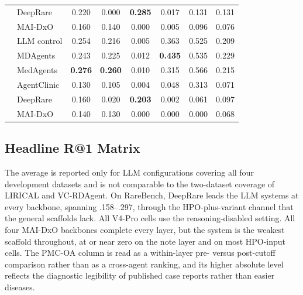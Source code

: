 \begin{table}[hbpt]
\begin{tabular}{@{}llcccccc@{}}
 & DeepRare & 0.220 & 0.000 & \textbf{0.285} & 0.017 & 0.131 & 0.131 \\
 & MAI-DxO & 0.160 & 0.140 & 0.000 & 0.005 & 0.096 & 0.076 \\
\midrule
{} & LLM control & 0.254 & 0.216 & 0.005 & 0.363 & 0.525 & 0.209 \\
 & MDAgents & 0.243 & 0.225 & 0.012 & \textbf{0.435} & 0.535 & 0.229 \\
 & MedAgents & \textbf{0.276} & \textbf{0.260} & 0.010 & 0.315 & 0.566 & 0.215 \\
 & AgentClinic & 0.130 & 0.105 & 0.004 & 0.048 & 0.313 & 0.071 \\
 & DeepRare & 0.160 & 0.020 & \textbf{0.203} & 0.002 & 0.061 & 0.097 \\
 & MAI-DxO & 0.140 & 0.130 & 0.000 & 0.000 & 0.000 & 0.068 \\
\bottomrule
\end{tabular}
\end{table}
\subsection{Headline R@1 Matrix}
\label{sec-6-1}
The average is reported only for LLM configurations covering all four development datasets and is not comparable to the two-dataset coverage of LIRICAL and VC-RDAgent. On RareBench, DeepRare leads the LLM systems at every backbone, spanning .158--.297, through the HPO-plus-variant channel that the general scaffolds lack. All V4-Pro cells use the reasoning-disabled setting. All four MAI-DxO backbones complete every layer, but the system is the weakest scaffold throughout, at or near zero on the note layer and on most HPO-input cells. The PMC-OA column is read as a within-layer pre- versus post-cutoff comparison rather than as a cross-agent ranking, and its higher absolute level reflects the diagnostic legibility of published case reports rather than easier diseases.

